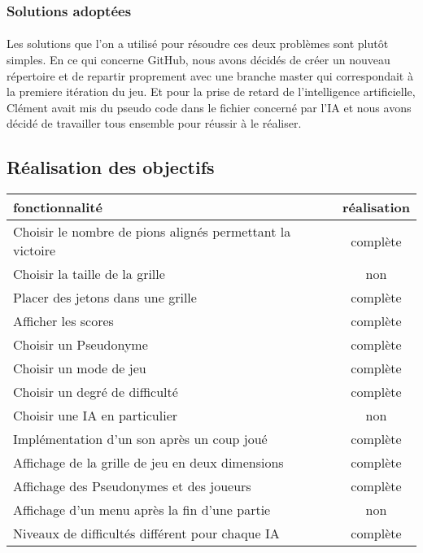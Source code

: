 \documentclass[a4paper,oneside]{article}
\begin{document}
\subsubsection{Solutions adoptées}
\paragraph{}
Les solutions que l'on a utilisé pour résoudre ces deux problèmes sont plutôt simples.
En ce qui concerne GitHub, nous avons décidés de créer un nouveau répertoire et de repartir proprement avec une branche master qui correspondait à la premiere itération du jeu.
Et pour la prise de retard de l'intelligence artificielle, Clément avait mis du pseudo code dans le fichier concerné par l'IA et nous avons décidé de travailler tous ensemble pour réussir à le réaliser. 


\subsection{Réalisation des objectifs }

\begin{tabular}{| l | c |}
\hline
fonctionnalité & réalisation \\
\hline
\hline
Choisir le nombre de pions alignés permettant la victoire  & complète \\
\hline
Choisir la taille de la grille & non \\
\hline
Placer des jetons dans une grille & complète \\
\hline
Afficher les scores & complète \\
\hline
Choisir un Pseudonyme & complète \\
\hline
Choisir un mode de jeu & complète \\
\hline
Choisir un degré de difficulté & complète \\
\hline
Choisir une IA en particulier & non \\
\hline
Implémentation d'un son après un coup joué & complète \\
\hline
Affichage de la grille de jeu en deux dimensions & complète \\
\hline
Affichage des Pseudonymes et des joueurs & complète \\
\hline
Affichage d'un menu après la fin d'une partie & non \\
\hline
Niveaux de difficultés différent pour chaque IA & complète \\
\hline
\end{tabular}
\end{document}
